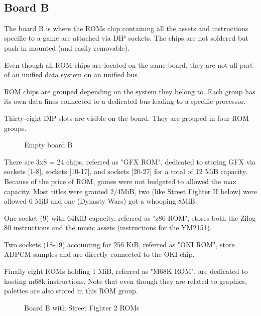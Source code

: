 \
\label{fig:boarda}


\label{fig:drawboarda}




\subsection{Board B}
   The board B is where the ROMs chip containing all the assets and instructions specific to a game are attached via DIP sockets. The chips are not soldered but push-in mounted (and easily removable).

   Even though all ROM chips are located on the same board, they are not all part of an unified data system on an unified bus. 

   ROM chips are grouped depending on the system they belong to. Each group has its own data lines connected to a dedicated bus leading to a specific processor. 

   Thirty-eight DIP slots are visible on the board. They are grouped in four ROM groups. 

\vfill
\begin{figure}[H]
  \caption*{Empty board B}
  \end{figure}
\pagebreak

   There are 3x8 = 24 chips, referred as "GFX ROM", dedicated to storing GFX via sockets [1-8], sockets [10-17], and sockets [20-27] for a total of 12 MiB capacity. Because of the price of ROM, games were not budgeted to allowed the max capacity. Most titles were granted 2/4MiB, two (like Street Fighter II below) were allowed 6 MiB and one (Dynasty Wars) got a whooping 8MiB.

   One socket (9) with 64KiB capacity, referred as "z80 ROM",  stores both the Zilog 80 instructions and the music assets (instructions for the YM2151). 

   Two sockets (18-19) accounting for 256 KiB, referred as "OKI ROM", store ADPCM samples and are directly connected to the OKI chip. 

   Finally eight ROMs holding 1 MiB, referred as "M68K ROM", are dedicated to hosting m68k instructions. Note that even though they are related to graphics, palettes are also stored in this ROM group. 


\vfill
\begin{figure}[H]
  \caption*{Board B with Street Fighter 2 ROMs}
  \end{figure}
\pagebreak


